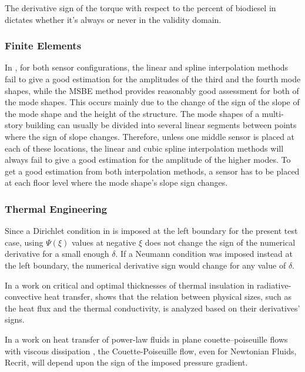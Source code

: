 \documentclass[11pt]{book}
\begin{document}
The derivative sign of the torque with respect to the percent of biodiesel
in \cite{bietresato2019use} dictates whether it's always or never
in the validity domain.


\subsubsection{Finite Elements}

In \cite{kaya2015system}, for both sensor configurations, the linear
and spline interpolation methods fail to give a good estimation for
the amplitudes of the third and the fourth mode shapes, while the
MSBE method provides reasonably good assessment for both of the mode
shapes. This occurs mainly due to the change of the sign of the slope
of the mode shape and the height of the structure. The mode shapes
of a multi-story building can usually be divided into several linear
segments between points where the sign of slope changes. Therefore,
unless one middle sensor is placed at each of these locations, the
linear and cubic spline interpolation methods will always fail to
give a good estimation for the amplitude of the higher modes. To get
a good estimation from both interpolation methods, a sensor has to
be placed at each floor level where the mode shape's slope sign changes.


\subsubsection{Thermal Engineering}

Since a Dirichlet condition in \cite{chalhub2013integral} is imposed
at the left boundary for the present test case, using $\Psi\left(\xi\right)$
values at negative $\xi$ does not change the sign of the numerical
derivative for a small enough $\delta$. If a Neumann condition was
imposed instead at the left boundary, the numerical derivative sign
would change for any value of $\delta$.

In a work on critical and optimal thicknesses of thermal insulation in radiative-convective heat transfer, \cite{zarubin2016critical} shows that the relation between physical
sizes, such as the heat flux and the thermal conductivity, is analyzed
based on their derivatives' signs.

In a work on heat transfer of power-law fluids in plane couette–poiseuille flows with viscous dissipation \cite{coelho2020heat}, the Couette-Poiseuille flow, even for Newtonian Fluids, Recrit, will depend upon the sign of the imposed pressure
gradient.
\end{document}
